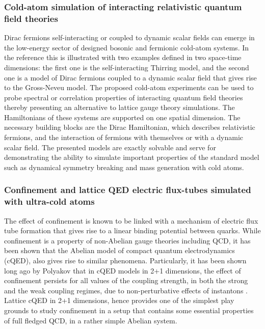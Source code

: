 \documentclass[epj,final]{svjour}
\begin{document}
\subsubsection{Cold-atom simulation of interacting relativistic quantum field theories\cite{cirac2010cold}}

Dirac fermions self-interacting or coupled to dynamic scalar fields can emerge in the low-energy sector of designed bosonic and fermionic cold-atom systems. In the reference \cite{cirac2010cold} this is illustrated with two examples defined in two space-time dimensions: the first one is the self-interacting Thirring model, and the second one is a model of Dirac fermions coupled to a dynamic scalar field that gives rise to the Gross-Neveu model. The proposed cold-atom experiments can be used to probe spectral or correlation properties of interacting quantum field theories thereby presenting an alternative to lattice gauge theory simulations. The Hamiltonians of these systems are supported on one spatial dimension. The necessary building blocks are the Dirac Hamiltonian, which describes relativistic fermions, and the interaction of fermions with themselves or with a dynamic scalar field. The presented models are exactly solvable and serve for demonstrating the ability to simulate important properties of the standard model such as dynamical symmetry breaking and mass generation with cold atoms.

\subsubsection{Confinement and lattice QED electric flux-tubes simulated with ultra-cold atoms\cite{zohar2011confinement}}

The effect of confinement is known to be linked with a mechanism of electric flux tube formation that gives rise to a linear binding potential between quarks. While confinement is a property of non-Abelian gauge theories including QCD, it has been shown that the Abelian model of compact quantum electrodynamics (cQED), also gives rise to similar phenomena. Particularly, it has been shown long ago by Polyakov that in cQED models in 2+1 dimensions, the effect of confinement persists for all values of the coupling strength, in both the strong and the weak coupling regimes, due to non-perturbative effects of instantons \cite{polyakov1977quark}. Lattice cQED in 2+1 dimensions, hence provides one of the simplest play grounds to study confinement in a setup that contains some essential properties of full fledged QCD, in a rather simple Abelian system. 
\end{document}
